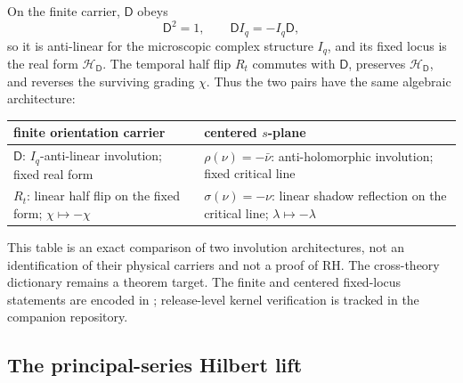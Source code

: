 \documentclass[11pt]{article}
\theoremstyle{definition}\newtheorem{definition}[theorem]{Definition}
\theoremstyle{remark}\newtheorem{remark}[theorem]{Remark}\newtheorem{conjecture}[theorem]{Conjecture}
\begin{document}
On the finite carrier, $\mathsf D$ obeys
\begin{equation}
 \mathsf D^2=1,
 \qquad
 \mathsf D I_q=-I_q\mathsf D,
\end{equation}
so it is anti-linear for the microscopic complex structure $I_q$, and its fixed locus is the real form $\mathcal H_{\mathsf D}$. The temporal half flip $R_t$ commutes with $\mathsf D$, preserves $\mathcal H_{\mathsf D}$, and reverses the surviving grading $\chi$. Thus the two pairs have the same algebraic architecture:
\begin{center}
\begin{tabular}{>{\raggedright\arraybackslash}p{} >{\raggedright\arraybackslash}p{}}
\toprule
finite orientation carrier & centered $s$-plane\\
\midrule
$\mathsf D$: $I_q$-anti-linear involution; fixed real form & $\rho(\nu)=-\bar\nu$: anti-holomorphic involution; fixed critical line\\
$R_t$: linear half flip on the fixed form; $\chi\mapsto-\chi$ & $\sigma(\nu)=-\nu$: linear shadow reflection on the critical line; $\lambda\mapsto-\lambda$\\
\bottomrule
\end{tabular}
\end{center}
This table is an exact comparison of two involution architectures, not an identification of their physical carriers and not a proof of RH. The cross-theory dictionary remains a theorem target. The finite and centered fixed-locus statements are encoded in ; release-level kernel verification is tracked in the companion repository.


\subsection{The principal-series Hilbert lift}
\end{document}
